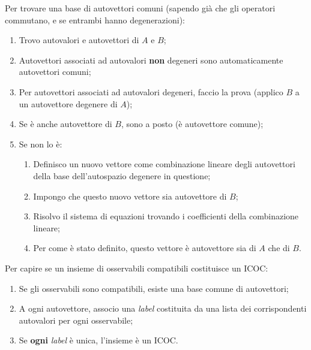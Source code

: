 \documentclass{article}
\begin{document}
\begin{minipage}{0.798\linewidth}
    \noindent Per trovare una base di autovettori comuni (sapendo già che gli operatori commutano, e se entrambi hanno degenerazioni):
    \begin{enumerate}
        \item Trovo autovalori e autovettori di $A$ e $B$;
        \item Autovettori associati ad autovalori \textbf{non} degeneri sono automaticamente autovettori comuni;
        \item Per autovettori associati ad autovalori degeneri, faccio la prova (applico $B$ a un autovettore degenere di $A$);
        \item Se è anche autovettore di $B$, sono a posto (è autovettore comune);
        \item Se non lo è:
        \begin{enumerate}
            \item Definisco un nuovo vettore come combinazione lineare degli autovettori della base dell'autospazio degenere in questione;
            \item Impongo che questo nuovo vettore sia autovettore di $B$;
            \item Risolvo il sistema di equazioni trovando i coefficienti della combinazione lineare;
            \item Per come è stato definito, questo vettore è autovettore sia di $A$ che di $B$.
        \end{enumerate}
    \end{enumerate}

    \noindent Per capire se un insieme di osservabili compatibili costituisce un ICOC:
    \begin{enumerate}
        \item Se gli osservabili sono compatibili, esiste una base comune di autovettori;
        \item A ogni autovettore, associo una \textit{label} costituita da una lista dei corrispondenti autovalori per ogni osservabile;
        \item Se \textbf{ogni} \textit{label} è unica, l'insieme è un ICOC.
    \end{enumerate}
\end{minipage}
\hfill
\end{document}
